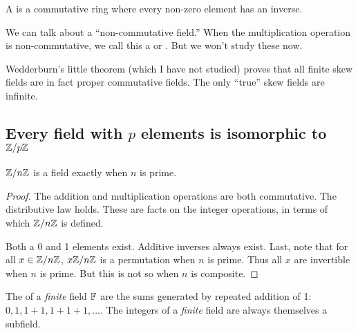 \begin{definition}
  A  is a commutative ring where every non-zero element
  has an inverse.
\end{definition}

\begin{definition}
  We can talk about a ``non-commutative field.'' When the multiplication
  operation is non-commutative, we call this a  or
  . But we won't study these now.

  Wedderburn's little theorem (which I have not studied) proves that all
  finite skew fields are in fact proper commutative fields. The only
  ``true'' skew fields are infinite.
\end{definition}

\subsection{Every field with $p$ elements is isomorphic to $\mathbb{Z} / p\mathbb{Z}$}

\begin{theorem}
  $\mathbb{Z} / n\mathbb{Z}$ is a field exactly when $n$ is prime.
\end{theorem}

\begin{proof}
  The addition and multiplication operations are both commutative. The
  distributive law holds. These are facts on the integer operations, in
  terms of which $\mathbb{Z} / n\mathbb{Z}$ is defined.

  Both a 0 and 1 elements exist. Additive inverses always exist. Last,
  note that for all $x \in \mathbb{Z} / n\mathbb{Z}$, $x\mathbb{Z} / n\mathbb{Z}$ is a permutation when $n$
  is prime. Thus all $x$ are invertible when $n$ is prime. But this is
  not so when $n$ is composite.
\end{proof}

\begin{theorem}
  The  of a \emph{finite} field $\mathbb{F}$ are the sums
  generated by repeated addition of 1: $0, 1, 1+1, 1+1+1, \ldots$. The
  integers of a \emph{finite} field are always themselves a subfield.
\end{theorem}


